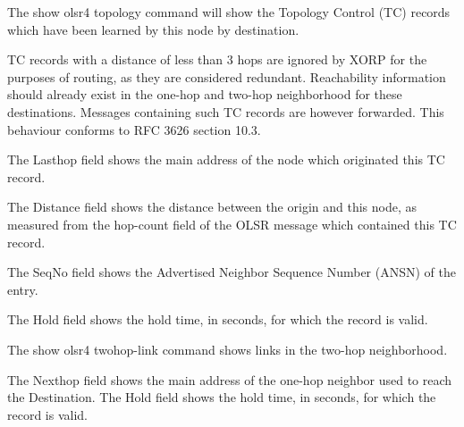The {\stt show olsr4 topology} command will show the Topology Control (TC)
records which have been learned by this node by destination.

TC records with a distance of less than 3 hops are ignored by XORP for the
purposes of routing, as they are considered redundant. Reachability information
should already exist in the one-hop and two-hop neighborhood for these destinations.
Messages containing such TC records are however forwarded.
This behaviour conforms to RFC 3626 section 10.3.

The Lasthop field shows the main address of the node which originated this TC record.

The Distance field shows the distance between the origin and this node, as measured
from the hop-count field of the OLSR message which contained this TC record.

The SeqNo field shows the Advertised Neighbor Sequence Number (ANSN) of the entry.

The Hold field shows the hold time, in seconds, for which the record is valid.

\vspace{0.1in}
\noindent{}

\newpage
The {\stt show olsr4 twohop-link} command shows links in the two-hop neighborhood.

The Nexthop field shows the main address of the one-hop neighbor used to reach
the Destination. The Hold field shows the hold time, in seconds, for which the
record is valid.

